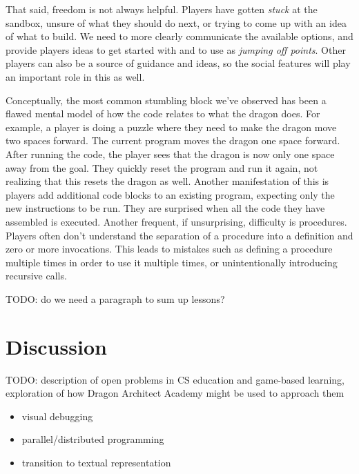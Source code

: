 \documentclass{sig-alternate}
\newcommand{\TODO}[1]{{\color{red} TODO: #1}}
\newcommand{\gametitle}{{\color{RoyalPurple} Dragon Architect Academy}}
\begin{document}
That said, freedom is not always helpful.
Players have gotten \emph{stuck} at the sandbox, unsure of what they should do next, or trying to come up with an idea of what to build. 
We need to more clearly communicate the available options, and provide players ideas to get started with and to use as \emph{jumping off points}.
Other players can also be a source of guidance and ideas, so the social features will play an important role in this as well.

Conceptually, the most common stumbling block we've observed has been a flawed mental model of how the code relates to what the dragon does. 
For example, a player is doing a puzzle where they need to make the dragon move two spaces forward. 
The current program moves the dragon one space forward. 
After running the code, the player sees that the dragon is now only one space away from the goal. 
They quickly reset the program and run it again, not realizing that this resets the dragon as well. 
Another manifestation of this is players add additional code blocks to an existing program, expecting only the new instructions to be run. 
They are surprised when all the code they have assembled is executed. 
Another frequent, if unsurprising, difficulty is procedures. 
Players often don't understand the separation of a procedure into a definition and zero or more invocations. 
This leads to mistakes such as defining a procedure multiple times in order to use it multiple times, or unintentionally introducing recursive calls. 

\TODO{do we need a paragraph to sum up lessons?}

\section{Discussion}
\TODO{description of open problems in CS education and game-based learning, exploration of how \gametitle{} might be used to approach them}
\begin{itemize}
\item visual debugging
\item parallel/distributed programming
\item transition to textual representation
\end{itemize}



 
\end{document}
